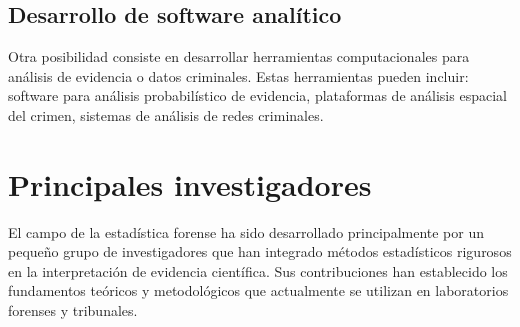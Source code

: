 \documentclass[a4paper,10pt,oneside]{article}
\begin{document}
\subsection{Desarrollo de software anal\'itico}

Otra posibilidad consiste en desarrollar herramientas computacionales para an\'alisis de evidencia o datos criminales. Estas herramientas pueden incluir: software para an\'alisis probabil\'istico de evidencia, plataformas de an\'alisis espacial del crimen, sistemas de an\'alisis de redes criminales.


\section{Principales investigadores}

El campo de la estad\'istica forense ha sido desarrollado principalmente por un peque\~no grupo de investigadores que han integrado m\'etodos estad\'isticos rigurosos en la interpretaci\'on de evidencia cient\'ifica. Sus contribuciones han establecido los fundamentos te\'oricos y metodol\'ogicos que actualmente se utilizan en laboratorios forenses y tribunales.
\end{document}
